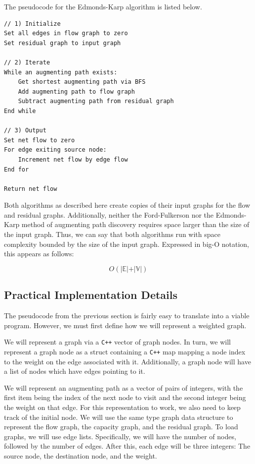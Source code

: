 \documentclass[12pt]{amsart}
\begin{document}
    The pseudocode for the Edmonds-Karp algorithm is listed
    below.

\begin{verbatim}
// 1) Initialize
Set all edges in flow graph to zero
Set residual graph to input graph

// 2) Iterate
While an augmenting path exists:
    Get shortest augmenting path via BFS
    Add augmenting path to flow graph
    Subtract augmenting path from residual graph
End while

// 3) Output
Set net flow to zero
For edge exiting source node:
    Increment net flow by edge flow
End for

Return net flow
\end{verbatim}

    Both algorithms as described here create copies of their
    input graphs for the flow and residual graphs. Additionally,
    neither the Ford-Fulkerson nor the Edmonds-Karp method of
    augmenting path discovery requires space larger than the
    size of the input graph. Thus, we can say that both
    algorithms run with space complexity bounded by the size of
    the input graph. Expressed in big-O notation, this appears
    as follows:

    \[
        O( \vert \mathbb{E} \vert + \vert \mathbb{V} \vert )
    \]

\subsection{Practical Implementation Details}

    The pseudocode from the previous section is fairly easy to
    translate into a viable program. However, we must first
    define how we will represent a weighted graph.

    We will represent a graph via a \verb|C++| vector of graph
    nodes. In turn, we will represent a graph node as a struct
    containing a \verb|C++| map mapping a node index to the
    weight on the edge associated with it. Additionally, a graph
    node will have a list of nodes which have edges pointing to
    it.

    We will represent an augmenting path as a vector of pairs of
    integers, with the first item being the index of the next
    node to visit and the second integer being the weight on
    that edge. For this representation to work, we also need to
    keep track of the initial node. We will use the same type
    graph data structure to represent the flow graph, the
    capacity graph, and the residual graph. To load graphs, we
    will use edge lists. Specifically, we will have the number
    of nodes, followed by the number of edges. After this, each
    edge will be three integers: The source node, the
    destination node, and the weight.
\end{document}
